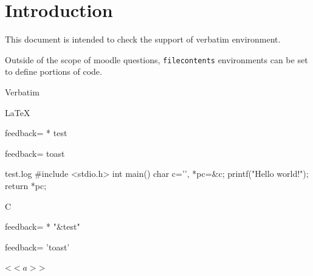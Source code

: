 \documentclass{article}
\begin{document}
\section*{Introduction}

This document is intended to check the support of verbatim environment.

Outside of the scope of moodle questions, \texttt{filecontents} environments 
can be set to define portions of code.

\begin{quiz}{Verbatim}


\begin{multi}{LaTeX}

\item[feedback={}]* test
\item[feedback={}] toast
\end{multi}

\begin{filecontents*}[overwrite]{test.log}
#include <stdio.h>
int main() {
    char c='\0', *pc=&c;
    printf("Hello world!\n");
    return *pc;
}
\end{filecontents*}
\begin{multi}{C}

\item[feedback={}]* "\&test"
\item[feedback={}] 'toast'
\item <$<a>$>
\end{multi}

\end{quiz}
\end{document}
